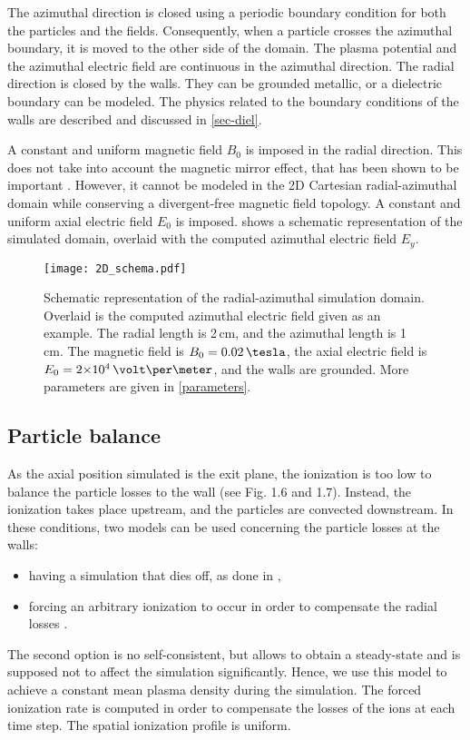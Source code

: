 The azimuthal direction is closed using a periodic boundary condition for both the particles and the fields.
Consequently, when a particle crosses the azimuthal boundary, it is moved to the other side of the domain.
The plasma potential and the azimuthal electric field are continuous in the azimuthal direction.
The radial direction is closed by the walls.
They can be grounded metallic, or a dielectric boundary can be modeled.
The physics related to the boundary conditions of the walls are described and discussed in \cref{sec-diel}.

A constant and uniform magnetic field $B_0$ is imposed in the radial direction.
This does not take into account the magnetic mirror effect, that has been shown to be important \citep{keidar2005,yu2008a,dominguez-vazquez2018}.
However, it cannot be modeled in the \ac{2D} Cartesian radial-azimuthal domain while conserving a divergent-free magnetic field topology.
A constant and uniform axial electric field $E_0$ is imposed.
 shows a schematic representation of the simulated domain, overlaid with the computed azimuthal electric field $E_y$.

\begin{figure}[hbt]
  \centering
  \texttt{[image: 2D\_schema.pdf]}
  \caption{Schematic representation of the radial-azimuthal simulation domain. Overlaid is the computed azimuthal electric field given as an example. The radial length is 2\,cm, and the azimuthal length is 1\,cm.
  The magnetic field is $B_0=0.02\,\tesla$, the axial electric field is $E_0=\sn{2}{4}\,\volt\per\meter$, and the walls are grounded. More parameters are given in \cref{parameters}.}
  \label{fig-2dschemat}
\end{figure}

\subsection{Particle balance}
As the axial position simulated is the exit plane, the ionization is too low to balance the particle losses to the wall (see Fig. 1.6 and 1.7).
Instead, the ionization takes place upstream, and the particles are convected downstream.
In these conditions, two models can be used concerning the particle losses at the walls\string:
\begin{itemize}
  \item having a simulation that dies off, as done in \citet{janhunen2018},
  \item forcing an arbitrary ionization to occur in order to compensate the radial losses \citep{dominguez-vazquez2018}.
\end{itemize}
The second option is no self-consistent, but allows to obtain a steady-state and is supposed not to affect the simulation significantly.
Hence, we use this model to achieve a constant mean plasma density during the simulation.
The forced ionization rate is computed in order to compensate the losses of the ions at each time step.
The spatial ionization  profile is uniform.


